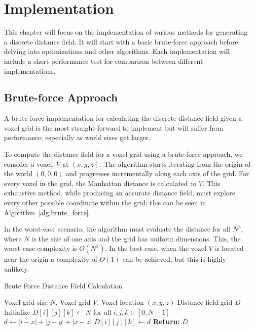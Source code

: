\chapter{Implementation}
This chapter will focus on the implementation of various methods for generating a discrete distance field. It will start
with a basic brute-force approach before delving into optimizations and other algorithms. Each implementation will
include a short performance test for comparison between different implementations.

\section{Brute-force Approach}
A brute-force implementation for calculating the discrete distance field given a voxel grid is the most straight-forward
to implement but will suffer from performance; especially as world sizes get larger.

To compute the distance field for a voxel grid using a brute-force approach, we consider a voxel, \(V\) at
\((x, y, z)\). The algorithm starts iterating from the origin of the world \((0, 0, 0)\) and progresses incrementally
along each axis of the grid. For every voxel in the grid, the Manhattan distance is calculated to \(V\). This exhaustive
method, while producing an accurate distance field, must explore every other possible coordinate within the grid; this
can be seen in Algorithm~\ref{alg:brute_force}.

In the worst-case scenario, the algorithm must evaluate the distance for all \(N^3\), where \(N\) is the size of one
axis and the grid has uniform dimensions. This, the worst-case complexity is \(O(N^3)\). In the best-case, when the
voxel \(V\) is located near the origin a complexity of \(O(1)\) can be achieved, but this is highly unlikely.

\begin{algorithm}
    \caption{Brute Force Distance Field Calculation}
    \label{alg:brute_force}
    \begin{algorithmic}[1]
        \REQUIRE Voxel grid size \(N\), Voxel grid \(V\), Voxel location \((x, y, z)\)
        \ENSURE Distance field grid \(D\)
        \STATE Initialize \(D[i][j][k] \gets N\) for all \(i, j, k \in [0, N-1]\)
        \STATE \(d \gets |i - x| + |j - y| + |x - z|\) 
        \STATE \(D[i][j][k] \gets d\) 
        \ENDIF
        \ENDIF
        \ENDFOR
        \ENDFOR
        \ENDFOR
        \STATE \textbf{Return:} \(D\)
    \end{algorithmic}
\end{algorithm}

